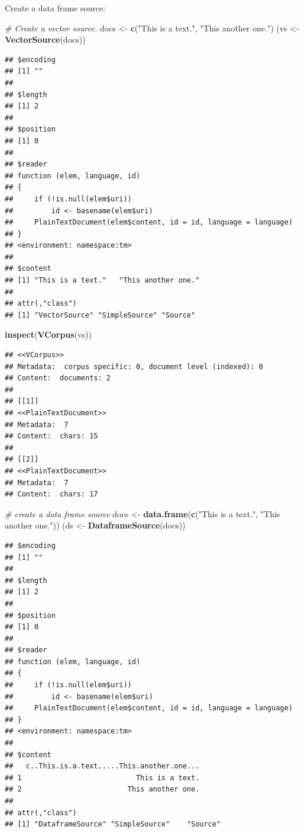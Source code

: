 \documentclass[]{book}
\newenvironment{Shaded}{\begin{snugshade}}{\end{snugshade}}
\newcommand{\KeywordTok}[1]{\textcolor[rgb]{0.13,0.29,0.53}{\textbf{{#1}}}}
\newcommand{\StringTok}[1]{\textcolor[rgb]{0.31,0.60,0.02}{{#1}}}
\newcommand{\CommentTok}[1]{\textcolor[rgb]{0.56,0.35,0.01}{\textit{{#1}}}}
\newcommand{\NormalTok}[1]{{#1}}
\begin{document}
Create a data frame source:

\begin{Shaded}
\begin{Highlighting}[]
\CommentTok{# Create a vector source.}
\NormalTok{docs <-}\StringTok{ }\KeywordTok{c}\NormalTok{(}\StringTok{"This is a text."}\NormalTok{, }\StringTok{"This another one."}\NormalTok{)}
\NormalTok{(vs <-}\StringTok{ }\KeywordTok{VectorSource}\NormalTok{(docs))}
\end{Highlighting}
\end{Shaded}

\begin{verbatim}
## $encoding
## [1] ""
## 
## $length
## [1] 2
## 
## $position
## [1] 0
## 
## $reader
## function (elem, language, id) 
## {
##     if (!is.null(elem$uri)) 
##         id <- basename(elem$uri)
##     PlainTextDocument(elem$content, id = id, language = language)
## }
## <environment: namespace:tm>
## 
## $content
## [1] "This is a text."   "This another one."
## 
## attr(,"class")
## [1] "VectorSource" "SimpleSource" "Source"
\end{verbatim}

\begin{Shaded}
\begin{Highlighting}[]
\KeywordTok{inspect}\NormalTok{(}\KeywordTok{VCorpus}\NormalTok{(vs))}
\end{Highlighting}
\end{Shaded}

\begin{verbatim}
## <<VCorpus>>
## Metadata:  corpus specific: 0, document level (indexed): 0
## Content:  documents: 2
## 
## [[1]]
## <<PlainTextDocument>>
## Metadata:  7
## Content:  chars: 15
## 
## [[2]]
## <<PlainTextDocument>>
## Metadata:  7
## Content:  chars: 17
\end{verbatim}

\begin{Shaded}
\begin{Highlighting}[]
\CommentTok{# create a data frame source}
\NormalTok{docs <-}\StringTok{ }\KeywordTok{data.frame}\NormalTok{(}\KeywordTok{c}\NormalTok{(}\StringTok{"This is a text."}\NormalTok{, }\StringTok{"This another one."}\NormalTok{))}
\NormalTok{(ds <-}\StringTok{ }\KeywordTok{DataframeSource}\NormalTok{(docs))}
\end{Highlighting}
\end{Shaded}

\begin{verbatim}
## $encoding
## [1] ""
## 
## $length
## [1] 2
## 
## $position
## [1] 0
## 
## $reader
## function (elem, language, id) 
## {
##     if (!is.null(elem$uri)) 
##         id <- basename(elem$uri)
##     PlainTextDocument(elem$content, id = id, language = language)
## }
## <environment: namespace:tm>
## 
## $content
##   c..This.is.a.text.....This.another.one...
## 1                           This is a text.
## 2                         This another one.
## 
## attr(,"class")
## [1] "DataframeSource" "SimpleSource"    "Source"
\end{verbatim}
\end{document}
